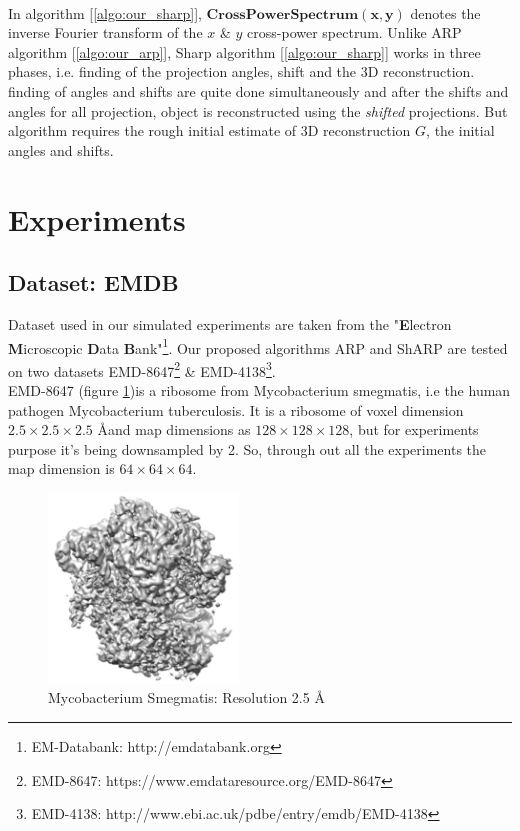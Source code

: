\documentclass{report}
\begin{document}
\hspace{1cm}\\
In algorithm [\ref{algo:our_sharp}], ${\boldsymbol{CrossPowerSpectrum(x,y)}}$ denotes the inverse Fourier transform of the $x$ \& $y$ cross-power spectrum. Unlike ARP algorithm [\ref{algo:our_arp}], Sharp algorithm [\ref{algo:our_sharp}] works in three phases, i.e. finding of the projection angles, shift and the 3D reconstruction. finding of angles and shifts are quite done simultaneously and after the shifts and angles for all projection, object is reconstructed using the \textit{shifted} projections. But algorithm requires the rough initial estimate of 3D reconstruction $G$, the initial angles and shifts.    

\section{Experiments}
\subsection{Dataset: EMDB}

Dataset used in our simulated experiments are taken from the "\textbf{E}lectron \textbf{M}icroscopic \textbf{D}ata \textbf{B}ank"\footnote{EM-Databank: http://emdatabank.org}. Our proposed algorithms ARP and ShARP are tested on two datasets EMD-8647\footnote{EMD-8647: https://www.emdataresource.org/EMD-8647} \& EMD-4138\footnote{EMD-4138: http://www.ebi.ac.uk/pdbe/entry/emdb/EMD-4138}.\\  

EMD-8647 (figure \ref{fig:EMD-8647-3d-struct})is a ribosome from Mycobacterium smegmatis, i.e the human pathogen Mycobacterium tuberculosis. It is a ribosome of voxel dimension $2.5\times2.5\times2.5$ \AA and map dimensions as $128\times128\times128$, but for experiments purpose it's being downsampled by 2. So, through out all the experiments the map dimension is $64\times64\times64$.  

\begin{figure}[H]
\includegraphics[width=0.45\textwidth]{Emd_8647.png}
\centering
\captionsetup{justification=centering}
\caption{Mycobacterium Smegmatis: Resolution 2.5 \AA }
\label{fig:EMD-8647-3d-struct}
\end{figure}
\end{document}
